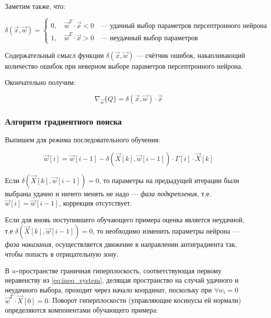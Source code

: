\documentclass[a4paper]{article}
\numberwithin{equation}{subsection}
\begin{document}
Заметим также, что:

\begin{equation}
    \delta (\vec{x}, \vec{w}) =
    \begin{cases}
        0, \quad \vec{w}^T \cdot \vec{x} < 0 \quad \textrm{--- удачный выбор параметров персептронного нейрона}\\
        1, \quad \vec{w}^T \cdot \vec{x} > 0 \quad \textrm{--- неудачный выбор параметров}
    \end{cases}
\end{equation}

Содержательный смысл функции $\delta (\vec{x}, \vec{w})$ --- счётчик ошибок,
накапливающий количество ошибок при неверном выборе параметров персептронного нейрона.

Окончательно получим:

\begin{equation}
    \nabla_{\vec{w}} \{Q\} = \delta (\vec{x}, \vec{w}) \cdot \vec{x}
\end{equation}



\subsubsection{Алгоритм градиентного поиска}

Выпишем для режима последовательного обучения:

\begin{equation}
    \vec{w}[i] = \vec{w}[i-1] - \delta (\vec{X}[k], \vec{w}[i-1]) \cdot \Gamma[i] \cdot \vec{X}[k]
\end{equation}

Если $\delta (\vec{X}[k], \vec{w}[i-1]) = 0$, то параметры на предыдущей итерации были
выбраны удачно и ничего менять не надо --- \textit{фаза подкрепления}, т.е.
$\vec{w}[i] = \vec{w}[i-1]$, коррекция отсутствует.

Если для вновь поступившего обучающего примера оценка является неудачной, т.е
$\delta (\vec{X}[k], \vec{w}[i-1]) = 0$, то необходимо изменить параметры нейрона ---
\textit{фаза наказания}, осуществляется движение в направлении антиградиента так, чтобы
попасть в отрицательную зону.

В $w$-пространстве граничная гиперплоскость, соответствующая первому неравенству 
из \ref{eq:ineq_system}, делящая пространство на случай удачного и неудачного выбора,
проходит через начало координат, поскольку при $\forall w_i = 0$ 
$\vec{w}^T \cdot \vec{X}[0] = 0$. Поворот гиперплоскости (управляющие косинусы ей нормали)
определяются компонентами обучающего примера: 
\end{document}
